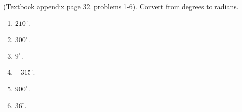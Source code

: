 (Textbook appendix page 32, problems 1-6). 
Convert from degrees to radians.
\begin{multicols}{3}
\begin{enumerate}
\item $210^\circ$.
\item $300^\circ$.
\item $9^\circ$.
\item $-315^\circ$.
\item $900^\circ$.
\item $36^\circ$.
\end{enumerate}
\end{multicols}
